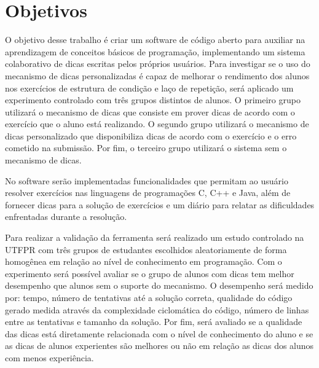 \chapter{Objetivos}

O objetivo desse trabalho é criar um software de código aberto para auxiliar na aprendizagem de conceitos básicos de programação, implementando um sistema colaborativo de dicas escritas pelos próprios usuários. Para investigar se o uso do mecanismo de dicas personalizadas é capaz de melhorar o rendimento dos alunos nos exercícios de estrutura de condição e laço de repetição, será aplicado um experimento controlado com três grupos distintos de alunos. O primeiro grupo utilizará o mecanismo de dicas que consiste em prover dicas de acordo com o exercício que o aluno está realizando. O segundo grupo utilizará o mecanismo de dicas personalizado que disponibiliza dicas de acordo com o exercício e o erro cometido na submissão. Por fim, o terceiro grupo utilizará o sistema sem o mecanismo de dicas.
	
No software serão implementadas funcionalidades que permitam ao usuário resolver exercícios nas linguagens de programações C, C++ e Java, além de fornecer dicas para a solução de exercícios e um diário para relatar as dificuldades enfrentadas durante a resolução.
	
Para realizar a validação da ferramenta será realizado um estudo controlado na UTFPR com três grupos de estudantes escolhidos aleatoriamente de forma homogênea em relação ao nível de conhecimento em programação. Com o experimento será possível avaliar se o grupo de alunos com dicas tem melhor desempenho que alunos sem o suporte do mecanismo. O desempenho será medido por: tempo, número de tentativas até a solução correta, qualidade do código gerado medida através da complexidade ciclomática do código, número de linhas entre as tentativas e tamanho da solução. Por fim, será avaliado se a qualidade das dicas está diretamente relacionada com o nível de conhecimento do aluno e se as dicas de alunos experientes são melhores ou não em relação as dicas dos alunos com menos experiência.
